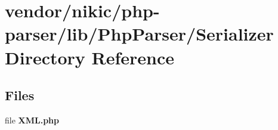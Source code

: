 \section{vendor/nikic/php-\/parser/lib/\+Php\+Parser/\+Serializer Directory Reference}
\label{dir_523d9964404f4e37a3bc9b965467ed74}
\subsection*{Files}
\begin{DoxyCompactItemize}
\item 
file {\bf X\+M\+L.\+php}
\end{DoxyCompactItemize}
